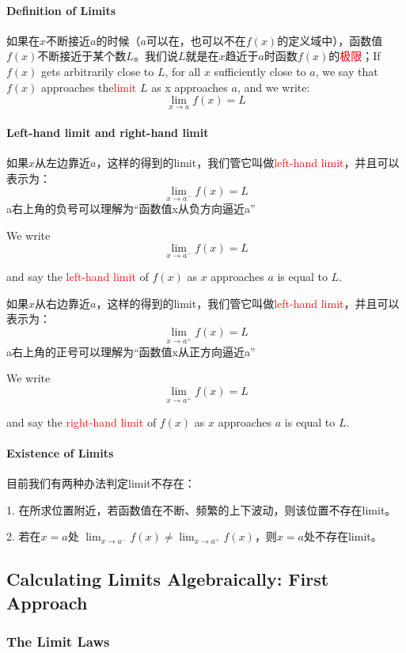 \documentclass[UTF8]{ctexart}
\begin{document}
\paragraph{Definition of Limits}
如果在$x$不断接近$a$的时候（$a$可以在，也可以不在$f(x)$的定义域中），函数值$f(x)$不断接近于某个数$L$。我们说$L$就是在$x$趋近于$a$时函数$f(x)$的\textcolor{red}{极限}；If $f(x)$ gets arbitrarily close to $L$, for all $x$ sufficiently close to $a$, we say that $f(x)$ approaches the\textcolor{red}{limit} $L$ as x approaches $a$, and we write:
\[{\lim_{x\to a }} f(x) = L\]

\paragraph{Left-hand limit and right-hand limit}
 如果$x$从左边靠近$a$，这样的得到的limit，我们管它叫做\textcolor{red}{left-hand limit}，并且可以表示为：
\[ {\lim_{x\to a^- }} f(x) = L\]
a右上角的负号可以理解为“函数值x从负方向逼近a”

We write \[ {\lim_{x\to a^- }} f(x) = L\]

and say the \textcolor{red}{left-hand limit} of $f(x)$ as $x$ approaches $a$ is equal to $L$.

如果$x$从右边靠近$a$，这样的得到的limit，我们管它叫做\textcolor{red}{left-hand limit}，并且可以表示为：
\[ {\lim_{x\to a^+ }} f(x) = L\]
a右上角的正号可以理解为“函数值x从正方向逼近a”

We write \[ {\lim_{x\to a^+ }} f(x) = L\]

and say the \textcolor{red}{right-hand limit} of $f(x)$ as $x$ approaches $a$ is equal to $L$.

\paragraph{Existence of Limits}
目前我们有两种办法判定limit不存在：

1. 在所求位置附近，若函数值在不断、频繁的上下波动，则该位置不存在limit。

2. 若在$x = a$处 $ {\lim_{x\to a^- }} f(x) \not = {\lim_{x\to a^+ }}  f(x) $，则$x=a $处不存在limit。

\subsection{Calculating Limits Algebraically: First Approach}
\subsubsection{The Limit Laws}
\end{document}

